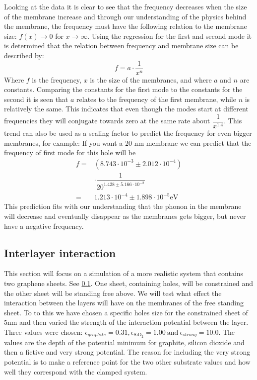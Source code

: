 Looking at the data it is clear to see that the frequency decreases when the size of the membrane increase and through our understanding of the physics behind the membrane, the frequency must have the following relation to the membrane size: $f(x)\rightarrow0$ for $x\rightarrow\infty$. Using the regression for the first and second mode it is determined that the relation between frequency and membrane size can be described by:\begin{equation}
    f=a\cdot\dfrac{1}{x^n}
\end{equation}Where $f$ is the frequency, $x$ is the size of the membranes, and where $a$ and $n$ are constants. Comparing the constants for the first mode to the constants for the second it is seen that $a$ relates to the frequency of the first membrane, while $n$ is relatively the same. This indicates that even though the modes start at different frequencies they will conjugate towards zero at the same rate about $\dfrac{1}{x^{1.4}}$. This trend can also be used as a scaling factor to predict the frequency for even bigger membranes, for example: If you want a 20 nm membrane we can predict that the frequency of first mode for this hole will be
    \begin{align}
     f = & \left(8.743\cdot10^{-3}\pm2.012\cdot10^{-4}\right)\\
    & \cdot\dfrac{1}{20^{1.428\pm5.166\cdot10^{-2}}}\\
    = & 1.213\cdot10^{-4}\pm 1.898\cdot 10^{-5} \mathrm{eV}
    \end{align}
This prediction fits with our understanding that the phonon in the membrane will decrease and eventually disappear as the membranes gets bigger, but never have a negative frequency.

\subsection{Interlayer interaction}
This section will focus on a simulation of a more realistic system that contains two graphene sheets. See \cref{}. One sheet, containing holes, will be constrained and the other sheet will be standing free above. We will test what effect the interaction between the layers will have on the membranes of the free standing sheet. To to this we have chosen a specific holes size for the constrained sheet of 5nm and then varied the strength of the interaction potential between the layer. Three values were chosen: $\epsilon_{graphite}=0.31, \epsilon_{\text{SiO}_{2}}=1.00 \ \text{and} \ \epsilon_{strong}=10.0$. The values are the depth of the potential minimum for graphite, silicon dioxide and then a fictive and very strong potential. The reason for including the very strong potential is to make a reference point for the two other substrate values and how well they correspond with the clamped system. 
\onecolumngrid

